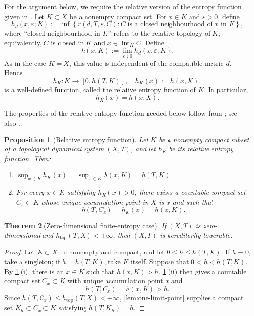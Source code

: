 \documentclass[10pt,a4paper]{amsart}
\newcommand{\htop}{h_{\mathrm{top}}}
\newtheorem{theorem}{Theorem}[section]
\newtheorem{proposition}[theorem]{Proposition}
\numberwithin{equation}{section}
\begin{document}
	For the argument below, we require the relative version of the entropy
	function given in \cite[Remark~5.13]{YeZhang2007}. Let $K\subset X$ be a
	nonempty compact set. For $x\in K$ and $\varepsilon>0$, define
	\[
	h_d(x,\varepsilon;K)
	:=
	\inf
	\left\{
	r(d,T,\varepsilon,C):
	C\text{ is a closed neighbourhood of }x\text{ in }K
	\right\},
	\]
	where ``closed neighbourhood in $K$'' refers to the relative topology of
	$K$; equivalently, $C$ is closed in $K$ and
	$x\in\operatorname{int}_K C$. Define
	\begin{equation}
		h(x,K)
		:=
		\lim_{\varepsilon\downarrow0}
		h_d(x,\varepsilon;K).
		\label{eq:relative-entropy-function}
	\end{equation}
	As in the case $K=X$, this value is independent of the compatible metric
	$d$. Hence
	\[
	h_K\colon K\longrightarrow[0,h(T,K)],
	\quad
	h_K(x):=h(x,K),
	\]
	is a well-defined function, called the relative entropy function of $K$.
	In particular,
	\[
	h_X(x)=h(x,X).
	\]
	
	The properties of the relative entropy function needed below follow from
	\cite[Remark~5.13]{YeZhang2007}; see also
	\cite[Theorem~5.1]{HYZ2010}.
	
	\begin{proposition}[Relative entropy function]
		\label{prop:local-entropy}
		Let $K$ be a nonempty compact subset of a topological dynamical system
		$(X,T)$, and let $h_K$ be its relative entropy function. Then:
		\begin{enumerate}
			\item
			$\sup_{x\in K}h_K(x)
			=
			\sup_{x\in K}h(x,K)
			=
			h(T,K).$
			
			\item For every $x\in K$ satisfying $h_K(x)>0$, there exists a
			countable compact set $C_x\subset K$ whose unique accumulation point
			in $X$ is $x$ and such that
			\[
			h(T,C_x)=h_K(x)=h(x,K).
			\]
		\end{enumerate}
	\end{proposition}
	
	\begin{theorem}[Zero-dimensional finite-entropy case]
		\label{thm:zero-dimensional}
		If $(X,T)$ is zero-dimensional and $\htop(T,X)<+\infty$, then $(X,T)$ is
		hereditarily lowerable.
	\end{theorem}
	
	\begin{proof}
		Let $K\subset X$ be nonempty and compact, and let
		$0\leq h\leq h(T,K)$. If $h=0$, take a singleton; if $h=h(T,K)$, take $K$
		itself. Suppose that $0<h<h(T,K)$. By
		\cref{prop:local-entropy} (i), there is an $x\in K$ such that $h(x,K)>h$.
		\cref{prop:local-entropy} (ii) then gives a countable compact set $C_x\subset K$ with unique
		accumulation point $x$ and
		\[
		h(T,C_x)=h(x,K)>h.
		\]
		Since $h(T,C_x)\leq\htop(T,X)<+\infty$,
		\cref{lem:one-limit-point} supplies a compact set
		$K_h\subset C_x\subset K$ satisfying $h(T,K_h)=h$.
	\end{proof}
	
\end{document}
